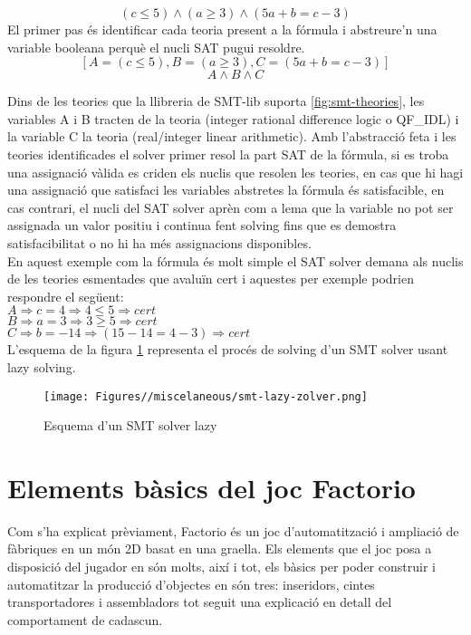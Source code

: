 $$ (c \le 5) \land (a \geq 3) \land (5a+b=c-3) $$
El primer pas és identificar cada teoria present a la fórmula i abstreure'n una variable booleana perquè el nucli SAT pugui resoldre.\\
$$ [A=(c \le 5), B=(a \geq 3), C=(5a+b=c-3)] $$
$$ A \land B \land C $$

Dins de les teories que la llibreria de SMT-lib suporta \ref{fig:smt-theories}, les variables A i B tracten de la teoria (integer rational difference logic o QF\_IDL) i la variable C la teoria (real/integer linear arithmetic). Amb l'abstracció feta i les teories identificades el solver primer resol la part SAT de la fórmula, si es troba una assignació vàlida es criden els nuclis que resolen les teories, en cas que hi hagi una assignació que satisfaci les variables abstretes la fórmula és satisfacible, en cas contrari, el nucli del SAT solver aprèn com a lema que la variable no pot ser assignada un valor positiu i continua fent solving fins que es demostra satisfacibilitat o no hi ha més assignacions disponibles.\\
En aquest exemple com la fórmula és molt simple el SAT solver demana als nuclis de les teories esmentades que avaluïn cert i aquestes per exemple podrien respondre el següent:\\
\(A \Rightarrow c=4 \Rightarrow 4\le5 \Rightarrow cert\)\\
\(B \Rightarrow a=3 \Rightarrow 3\geq5 \Rightarrow cert\)\\
\(C \Rightarrow b=-14 \Rightarrow (15-14=4-3) \Rightarrow cert\)\\
L'esquema de la figura \ref{fig:smt-solver-lazy} representa el procés de solving d'un SMT solver usant lazy solving.
\begin{figure}
    \centering
    \texttt{[image: Figures//miscelaneous/smt-lazy-zolver.png]}
    \caption{Esquema d'un SMT solver lazy \cite{SMT-solving}}
    \label{fig:smt-solver-lazy}
\end{figure}

\section{Elements bàsics del joc Factorio}
Com s'ha explicat prèviament, Factorio és un joc d'automatització i ampliació de fàbriques en un món 2D basat en una graella. Els elements que el joc posa a disposició del jugador en són molts, així i tot, els bàsics per poder construir i automatitzar la producció d'objectes en són tres: inseridors, cintes transportadores i assembladors tot seguit una explicació en detall del comportament de cadascun.

